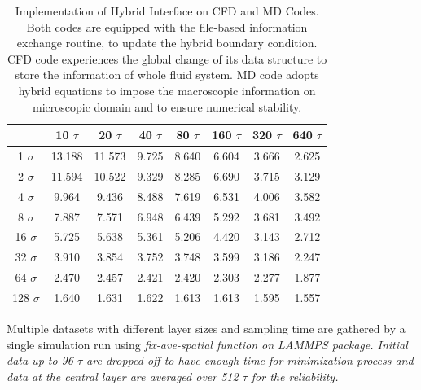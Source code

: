 \documentclass[conference,final]{IEEEtran}
\begin{document}
\begin{table}[t]
  \caption{\small Implementation of Hybrid Interface on CFD and MD Codes. Both codes are equipped with the file-based information exchange routine, to update the hybrid boundary condition. CFD code experiences the global change of its data structure to store the information of whole fluid system. MD code adopts hybrid equations to impose the macroscopic information on microscopic domain and to ensure numerical stability.}
  \label{table:MD_Vel0_L}
  \centering
  \begin{tabular}{c || c c c c c c c}
\hline
	&	10 $\tau$	&	20 $\tau$	&	40 $\tau$	&	80 $\tau$	&	160 $\tau$	&	320 $\tau$	&	640 $\tau$	\\
\hline
1 $\sigma$	&	13.188 	&	11.573 	&	9.725 	&	8.640 	&	6.604 	&	3.666 	&	2.625 	\\
2 $\sigma$	&	11.594 	&	10.522 	&	9.329 	&	8.285 	&	6.690 	&	3.715 	&	3.129 	\\
4 $\sigma$	&	9.964 	&	9.436 	&	8.488 	&	7.619 	&	6.531 	&	4.006 	&	3.582 	\\
8 $\sigma$	&	7.887 	&	7.571 	&	6.948 	&	6.439 	&	5.292 	&	3.681 	&	3.492 	\\
16 $\sigma$	&	5.725 	&	5.638 	&	5.361 	&	5.206 	&	4.420 	&	3.143 	&	2.712 	\\
32 $\sigma$	&	3.910 	&	3.854 	&	3.752 	&	3.748 	&	3.599 	&	3.186 	&	2.247 	\\
64 $\sigma$	&	2.470 	&	2.457 	&	2.421 	&	2.420 	&	2.303 	&	2.277 	&	1.877 	\\
128 $\sigma$	&	1.640 	&	1.631 	&	1.622 	&	1.613 	&	1.613 	&	1.595 	&	1.557 	\\
\hline
\end{tabular}
\vspace{-1em}
\end{table}
















Multiple datasets with different layer sizes and sampling time are gathered by a single simulation run using \it{fix-ave-spatial} function on LAMMPS package. Initial data up to 96 $\tau$ are dropped off to have enough time for minimization process and data at the central layer are averaged over 512 $\tau$ for the reliability.
\end{document}
